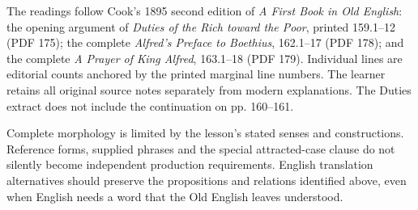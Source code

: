 The readings follow Cook’s 1895 second edition of \emph{A First Book in Old English}: the opening argument of \emph{Duties of the Rich toward the Poor}, printed 159.1–12 (PDF 175); the complete \emph{Alfred’s Preface to Boethius}, 162.1–17 (PDF 178); and the complete \emph{A Prayer of King Alfred}, 163.1–18 (PDF 179). Individual lines are editorial counts anchored by the printed marginal line numbers. The learner retains all original source notes separately from modern explanations. The Duties extract does not include the continuation on pp. 160–161.

Complete morphology is limited by the lesson’s stated senses and constructions. Reference forms, supplied phrases and the special attracted-case clause do not silently become independent production requirements. English translation alternatives should preserve the propositions and relations identified above, even when English needs a word that the Old English leaves understood.


